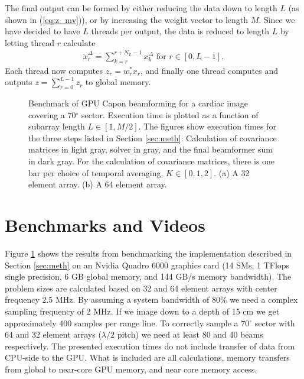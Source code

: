 \documentclass[conference]{IEEEtran}
\newcommand{\degree}{\ensuremath{^\circ}}
\begin{document}
The final output can be formed by either reducing the data down to length $L$ (as shown in (\ref{eq:z_mv})), or by increasing the weight vector to length $M$. Since we have decided to have $L$ threads per output, the data is reduced to length $L$ by letting thread $r$ calculate 
\begin{align}
\breve{x}_{r}^{\Delta} = \sum_{k=r}^{r+N_L-1}x_{k}^{\Delta} \text{ for } r \in [0, L-1].
\end{align}
Each thread now computes $z_r = w_r^*x_r$, and finally one thread computes and outputs $z = \sum_{r=0}^{L-1} z_r$ to global memory.

\begin{figure}[!t]
\centerline{
\hfil
{}}
\caption{Benchmark of GPU Capon beamforming for a cardiac image covering a $70\degree$ sector. Execution time is plotted as a function of subarray length $L \in [1, M/2]$. The figures show execution times for the three steps listed in Section \ref{sec:meth}: Calculation of covariance matrices in light gray, solver in gray, and the final beamformer sum in dark gray. For the calculation of covariance matrices, there is one bar per choice of temporal averaging, $K \in [0, 1, 2]$. (a) A 32 element array. (b) A 64 element array.}
\label{fig:bench}
\end{figure}

\section{Benchmarks and Videos}
Figure \ref{fig:bench} shows the results from benchmarking the implementation described in Section \ref{sec:meth} on an Nvidia Quadro 6000 graphics card (14 SMs, 1 TFlops single precision, 6 GB global memory, and 144 GB/s memory bandwidth). The problem sizes are calculated based on 32 and 64 element arrays with center frequency 2.5 MHz. By assuming a system bandwidth of 80\% we need a complex sampling frequency of 2 MHz. If we image down to a depth of 15 cm we get approximately 400 samples per range line. To correctly sample a $70\degree$ sector with 64 and 32 element arrays ($\lambda/2$ pitch) we need at least 80 and 40 beams respectively. The presented execution times do not include transfer of data from CPU-side to the GPU. What is included are all calculations, memory transfers from global to near-core GPU memory, and near core memory access. 
\end{document}
